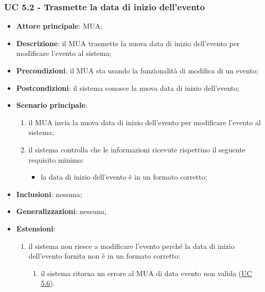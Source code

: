     \subsubsection{UC 5.2 - Trasmette la data di inizio dell'evento} \label{sec:UC5.2}
    \begin{itemize}
        \item \textbf{Attore principale}: MUA;
        \item \textbf{Descrizione}: il MUA trasmette la nuova data di inizio dell'evento per modificare l'evento al sistema;
        \item \textbf{Precondizioni}: il MUA sta usando la funzionalità di modifica di un evento;
        \item \textbf{Postcondizioni}: il sistema conosce la nuova data di inizio dell'evento;
        \item \textbf{Scenario principale}:
            \begin{enumerate}
                \item il MUA invia la nuova data di inizio dell'evento per modificare l'evento al sistema;
                \item il sistema controlla che le informazioni ricevute rispettino il seguente requisito minimo:
                    \begin{itemize}
                        \item la data di inizio dell'evento è in un formato corretto;
                    \end{itemize}
            \end{enumerate}
        \item \textbf{Inclusioni}: nessuna;
        \item \textbf{Generalizzazioni}: nessuna;
        \item \textbf{Estensioni}:
            \begin{enumerate}[label=\alph*.]
                \item il sistema non riesce a modificare l'evento perché la data di inizio dell'evento fornita non è in un formato corretto:
                \begin{enumerate}[label=\arabic*.]
                    \item il sistema ritorna un errore al MUA di data evento non valida (\hyperref[sec:UC5.6]{UC 5.6}).
                \end{enumerate}
            \end{enumerate}
    \end{itemize}


